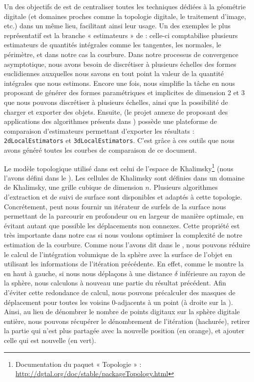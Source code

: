 Un des objectifs de \DGtal est de centraliser toutes les techniques dédiées à la
géométrie digitale (et domaines proches comme la topologie digitale, le
traitement d'image, etc.) dans un même lieu, facilitant ainsi leur usage. Un des
exemples le plus représentatif est la branche « estimateurs » de \DGtal :
celle-ci comptabilise plusieurs estimateurs de quantités intégrales comme
les tangentes, les normales, le périmètre, et dans notre cas la courbure. Dans
notre processus de convergence asymptotique, nous avons besoin de discrétiser à
plusieurs échelles des formes euclidiennes auxquelles nous savons en tout point
la valeur de la quantité intégrales que nous estimons. Encore une fois,
\DGtal nous simplifie la tâche en nous proposant de générer des formes
paramétriques et implicites de dimension 2 et 3 que nous pouvons discrétiser à
plusieurs échelles, ainsi que la possibilité de charger et exporter des objets.
Ensuite, \DGtalTools (le projet annexe de \DGtal proposant des applications des
algorithmes présents dans \DGtal) possède une plateforme de comparaison
d'estimateurs permettant d'exporter les résultats : \texttt{2dLocalEstimators}
et \texttt{3dLocalEstimators}. C'est grâce à ces outils que nous avons généré
toutes les courbes de comparaison de ce document.

Le modèle topologique utilisé dans \DGtal est celui de l'espace de
Khalimsky\footnote{Documentation du paquet « Topologie » :
\url{http://dgtal.org/doc/stable/packageTopology.html}} (nous l'avons défini
dans le ). Les cellules de Khalimsky sont définies
dans un domaine de Khalimsky, \cad une grille cubique de dimension $n$.
Plusieurs algorithmes d'extraction et de suivi de surface sont disponibles et
adaptés à cette topologie. Concrétement, \DGtal peut nous fournir un itérateur
de surfels de la surface nous permettant de la parcourir en profondeur ou en
largeur de manière optimale, \cad en évitant autant que possible les
déplacements non connexes. Cette propriété est très importante dans notre cas si
nous voulons optimiser la complexité de notre estimation de la courbure. Comme
nous l'avons dit dans le , nous pouvons réduire le
calcul de l'intégration volumique de la sphère avec la surface de l'objet en
utilisant les informations de l'itération précédente. En effet, comme le montre
la  en haut à gauche, si nous nous déplaçons à une
distance $\delta$ inférieure au rayon de la sphère, nous calculons à nouveau une
partie du résultat précédent. Afin d'éviter cette redondance de calcul, nous
pouvons précalculer des masques de déplacement pour toutes les voisins
$0$-adjacents à un point (à droite sur la ).
Ainsi, au lieu de dénombrer le nombre de points digitaux sur la sphère digitale
entière, nous pouvons récupérer le dénombrement de l'itération (hachurée),
retirer la partie qui n'est plus partagée avec la nouvelle position (en orange),
et ajouter celle qui est nouvelle (en vert).

